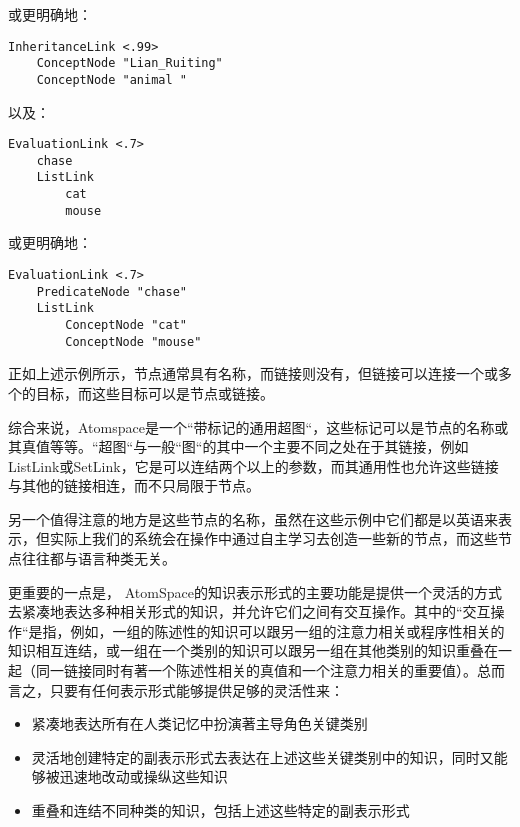 \noindent 或更明确地：

 {\tt\begin{small}\begin{lstlisting}
InheritanceLink <.99>
	ConceptNode "Lian_Ruiting"
	ConceptNode "animal "
\end{lstlisting}\end{small}}

以及：

{\tt\begin{small}\begin{lstlisting}
EvaluationLink <.7>
	chase 
	ListLink
		cat
		mouse
\end{lstlisting}\end{small}}

\noindent 或更明确地：

{\tt\begin{small}\begin{lstlisting}
EvaluationLink <.7>
	PredicateNode "chase" 
	ListLink
		ConceptNode "cat"
		ConceptNode "mouse"
\end{lstlisting}\end{small}}

\noindent 正如上述示例所示，节点通常具有名称，而链接则没有，但链接可以连接一个或多个的目标，而这些目标可以是节点或链接。

综合来说，Atomspace是一个“带标记的通用超图“，这些标记可以是节点的名称或其真值等等。“超图“与一般“图“的其中一个主要不同之处在于其链接，例如ListLink或SetLink，它是可以连结两个以上的参数，而其通用性也允许这些链接与其他的链接相连，而不只局限于节点。

另一个值得注意的地方是这些节点的名称，虽然在这些示例中它们都是以英语来表示，但实际上我们的系统会在操作中通过自主学习去创造一些新的节点，而这些节点往往都与语言种类无关。

更重要的一点是， AtomSpace的知识表示形式的主要功能是提供一个灵活的方式去紧凑地表达多种相关形式的知识，并允许它们之间有交互操作。其中的“交互操作“是指，例如，一组的陈述性的知识可以跟另一组的注意力相关或程序性相关的知识相互连结，或一组在一个类别的知识可以跟另一组在其他类别的知识重叠在一起（同一链接同时有著一个陈述性相关的真值和一个注意力相关的重要值）。总而言之，只要有任何表示形式能够提供足够的灵活性来：

\begin{itemize}
\item 紧凑地表达所有在人类记忆中扮演著主导角色关键类别
\item 灵活地创建特定的副表示形式去表达在上述这些关键类别中的知识，同时又能够被迅速地改动或操纵这些知识
\item 重叠和连结不同种类的知识，包括上述这些特定的副表示形式
\end{itemize}

